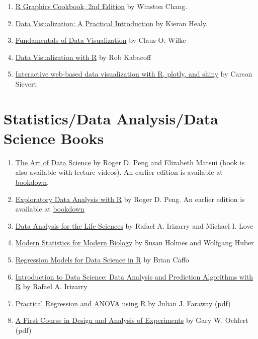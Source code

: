 \documentclass[
]{book}
\providecommand{\tightlist}{%
  \setlength{\itemsep}{0pt}\setlength{\parskip}{0pt}}
\begin{document}
\begin{enumerate}
\def\labelenumi{\arabic{enumi}.}
\tightlist
\item
  \href{https://r-graphics.org/}{R Graphics Cookbook, 2nd Edition} by Winston Chang.
\item
  \href{http://socviz.co/}{Data Visualization: A Practical Introduction} by Kieran Healy.
\item
  \href{https://serialmentor.com/dataviz/}{Fundamentals of Data Visualization} by Claus O. Wilke
\item
  \href{https://rkabacoff.github.io/datavis/}{Data Visualization with R} by Rob Kabacoff
\item
  \href{https://plotly-r.com/}{Interactive web-based data visualization with R, plotly, and shiny} by Carson Sievert
\end{enumerate}

\hypertarget{statisticsdata-analysisdata-science-books}{%
\section{Statistics/Data Analysis/Data Science Books}\label{statisticsdata-analysisdata-science-books}}

\begin{enumerate}
\def\labelenumi{\arabic{enumi}.}
\tightlist
\item
  \href{https://leanpub.com/artofdatascience}{The Art of Data Science} by Roger D. Peng and Elizabeth Matsui (book is also available with lecture videos). An earlier edition is available at \href{https://bookdown.org/rdpeng/artofdatascience/}{bookdown}.
\item
  \href{https://leanpub.com/exdata}{Exploratory Data Analysis with R} by Roger D. Peng. An earlier edition is available at \href{https://bookdown.org/rdpeng/exdata/}{bookdown}
\item
  \href{https://leanpub.com/dataanalysisforthelifesciences}{Data Analysis for the Life Sciences} by Rafael A. Irizarry and Michael I. Love
\item
  \href{http://web.stanford.edu/class/bios221/book/}{Modern Statistics for Modern Biology} by Susan Holmes and Wolfgang Huber
\item
  \href{https://leanpub.com/regmods}{Regression Models for Data Science in R} by Brian Caffo
\item
  \href{https://rafalab.github.io/dsbook/}{Introduction to Data Science: Data Analysis and Prediction Algorithms with R} by Rafael A. Irizarry
\item
  \href{https://cran.r-project.org/doc/contrib/Faraway-PRA.pdf}{Practical Regression and ANOVA using R} by Julian J. Faraway (pdf)
\item
  \href{http://users.stat.umn.edu/~gary/book/fcdae.pdf}{A First Course in Design and Analysis of Experiments} by Gary W. Oehlert (pdf)
\end{enumerate}
\end{document}
